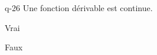 \begin{truefalse}{q-26}
Une fonction dérivable est continue.
\item* Vrai
\item Faux
\end{truefalse}

